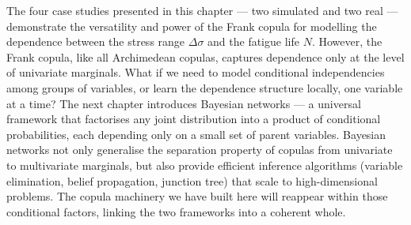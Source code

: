 The four case studies presented in this chapter — two simulated and two real — demonstrate the versatility and power of the Frank copula for modelling the dependence between the stress range \(\Delta\sigma\) and the fatigue life \(N\). However, the Frank copula, like all Archimedean copulas, captures dependence only at the level of univariate marginals. What if we need to model conditional independencies among groups of variables, or learn the dependence structure locally, one variable at a time? The next chapter introduces Bayesian networks — a universal framework that factorises any joint distribution into a product of conditional probabilities, each depending only on a small set of parent variables. Bayesian networks not only generalise the separation property of copulas from univariate to multivariate marginals, but also provide efficient inference algorithms (variable elimination, belief propagation, junction tree) that scale to high-dimensional problems. The copula machinery we have built here will reappear within those conditional factors, linking the two frameworks into a coherent whole. 